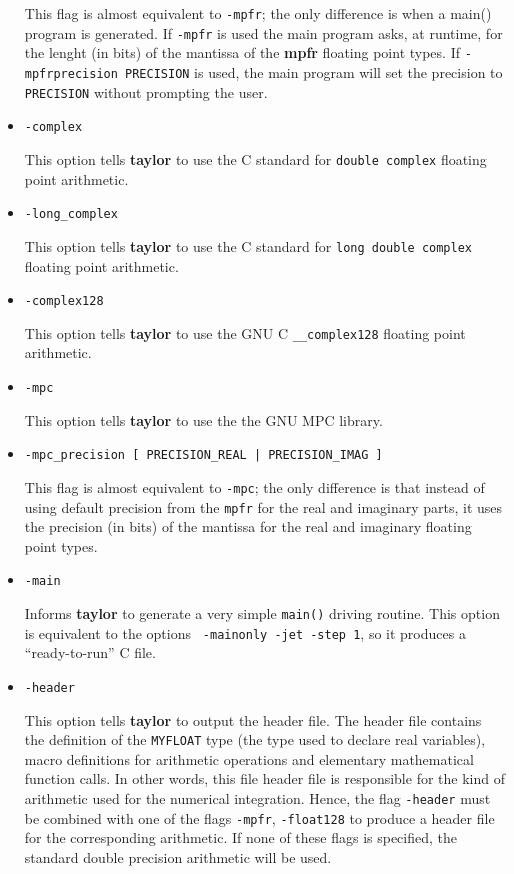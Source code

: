 \documentclass[10pt]{article}
\theoremstyle{remark}
\newcommand{\taylorname}{{\bf taylor}}
\newcommand{\myfloat}{{\tt MY\symbol{95}FLOAT}}
\begin{document}
\begin{itemize}
{This flag is almost equivalent to {\tt -mpfr}; the only difference is
when a main() program is generated. If {\tt -mpfr} is used the main
program asks, at runtime, for the lenght (in bits) of the mantissa of
the {\bf mpfr} floating point types. If {\tt -mpfrprecision
  PRECISION} is used, the main program will set the precision to {\tt
  PRECISION} without prompting the user.}


\item{\verb+-complex+

This option tells \taylorname{} to use the C standard for
\verb+double complex+ floating point arithmetic.  }

\item{\verb+-long_complex+

This option tells \taylorname{} to use the C standard for
\verb+long double complex+ floating point arithmetic.  }

\item{\verb+-complex128+

This option tells \taylorname{} to use the GNU C \verb+__complex128+
floating point arithmetic.  }

\item{\verb+-mpc+ 

This option tells \taylorname{} to use the the GNU MPC library.  }

\item{\verb+-mpc_precision [ PRECISION_REAL | PRECISION_IMAG ]+

This flag is almost equivalent to {\tt -mpc}; the only difference is
that instead of using default precision from the \verb+mpfr+ for the
real and imaginary parts, it uses the precision (in bits) of the
mantissa for the real and imaginary floating point types.}

\item{\verb+-main+

Informs \taylorname{} to generate a very simple \verb+main()+ driving
routine. This option is equivalent to the options {\tt
  -mainonly -jet -step 1}, so it produces a
``ready-to-run'' C file.  }

\item{\verb+-header+ 

This option tells \taylorname{} to output the header file. The header
file contains the definition of the \myfloat{} type (the type used to
declare real variables), macro definitions for arithmetic operations
and elementary mathematical function calls. In other words, this file
header file is responsible for the kind of arithmetic used for the
numerical integration.  Hence, the flag {\tt -header} must be combined
with one of the flags {\tt -mpfr}, {\tt -float128} to produce a header
file for the corresponding arithmetic. If none of these flags is
specified, the standard double precision arithmetic will be used.

}
\end{itemize}
\end{document}
